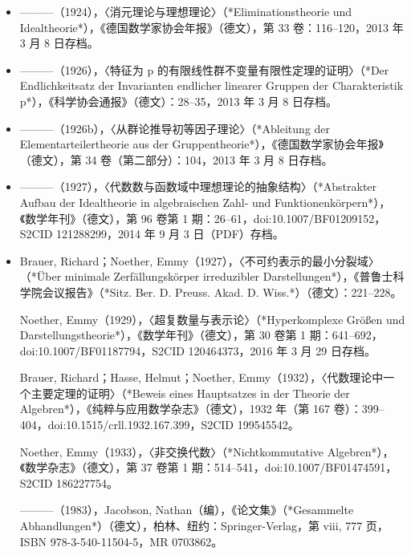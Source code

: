 \begin{itemize}
\item ———（1924），〈消元理论与理想理论〉（*Eliminationstheorie und Idealtheorie*），《德国数学家协会年报》（德文），第 33 卷：116–120，2013 年 3 月 8 日存档。

\item ———（1926），〈特征为 p 的有限线性群不变量有限性定理的证明〉（*Der Endlichkeitsatz der Invarianten endlicher linearer Gruppen der Charakteristik p*），《科学协会通报》（德文）：28–35，2013 年 3 月 8 日存档。

\item ———（1926b），〈从群论推导初等因子理论〉（*Ableitung der Elementarteilertheorie aus der Gruppentheorie*），《德国数学家协会年报》（德文），第 34 卷（第二部分）：104，2013 年 3 月 8 日存档。

\item ———（1927），〈代数数与函数域中理想理论的抽象结构〉（*Abstrakter Aufbau der Idealtheorie in algebraischen Zahl- und Funktionenkörpern*），《数学年刊》（德文），第 96 卷第 1 期：26–61，doi:10.1007/BF01209152，S2CID 121288299，2014 年 9 月 3 日（PDF）存档。

\item Brauer, Richard；Noether, Emmy（1927），〈不可约表示的最小分裂域〉（*Über minimale Zerfällungskörper irreduzibler Darstellungen*），《普鲁士科学院会议报告》（*Sitz. Ber. D. Preuss. Akad. D. Wiss.*）（德文）：221–228。

Noether, Emmy（1929），〈超复数量与表示论〉（*Hyperkomplexe Größen und Darstellungstheorie*），《数学年刊》（德文），第 30 卷第 1 期：641–692，doi:10.1007/BF01187794，S2CID 120464373，2016 年 3 月 29 日存档。

Brauer, Richard；Hasse, Helmut；Noether, Emmy（1932），〈代数理论中一个主要定理的证明〉（*Beweis eines Hauptsatzes in der Theorie der Algebren*），《纯粹与应用数学杂志》（德文），1932 年（第 167 卷）：399–404，doi:10.1515/crll.1932.167.399，S2CID 199545542。

Noether, Emmy（1933），〈非交换代数〉（*Nichtkommutative Algebren*），《数学杂志》（德文），第 37 卷第 1 期：514–541，doi:10.1007/BF01474591，S2CID 186227754。

———（1983），Jacobson, Nathan（编），《论文集》（*Gesammelte Abhandlungen*）（德文），柏林、纽约：Springer-Verlag，第 viii, 777 页，ISBN 978-3-540-11504-5，MR 0703862。

\end{itemize}